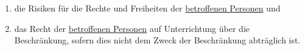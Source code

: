 \begin{enumerate}
\begin{enumerate}
    \item die Risiken für die Rechte und Freiheiten der \hyperref[itm:04-1]{betroffenen Personen} und
    \label{itm:23-2g}

    \item das Recht der \hyperref[itm:04-1]{betroffenen Personen} auf Unterrichtung über die Beschränkung, sofern dies nicht dem Zweck der
     Beschränkung abträglich ist.
    \label{itm:23-2h}

  \end{enumerate}

\end{enumerate}


